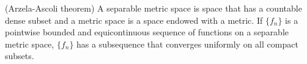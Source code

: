 \vspace{2ex}
\begin{thm}
(Arzela-Ascoli theorem) A separable metric space is space that has a countable dense subset and a metric space is a space endowed with a metric. If $\{f_{n}\}$ is a pointwise bounded and equicontinuous sequence of functions on a separable metric space, $\{f_{n}\}$ has a subsequence that converges uniformly on all compact subsets. 
\end{thm}

\vspace{2ex}

